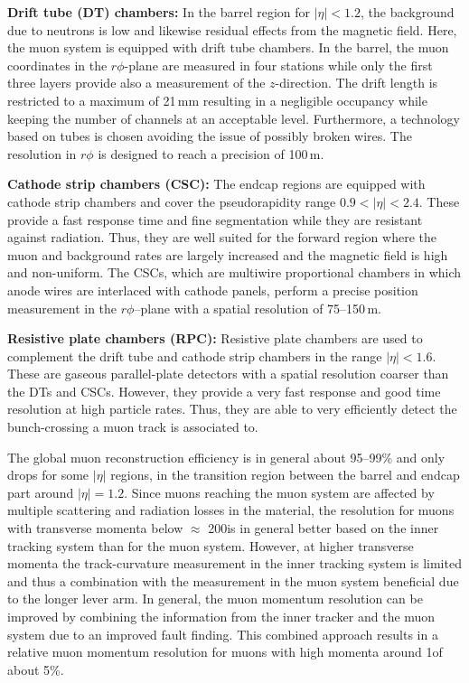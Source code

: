 \begin{description}
 \item \textbf{Drift tube (DT) chambers:} In the barrel region for $|\eta| < 1.2$, the background due to neutrons is low and likewise residual effects from the magnetic field. Here, the muon system is equipped with drift tube chambers. In the barrel, the muon coordinates in the $r\phi$-plane are measured in four stations while only the first three layers provide also a measurement of the $z$-direction. The drift length is restricted to a maximum of 21\,mm resulting in a negligible occupancy while keeping the number of channels at an acceptable level. Furthermore, a technology based on tubes is chosen avoiding the issue of possibly broken wires. The resolution in $r\phi$ is designed to reach a precision of 100\,\textmu m.
 \item \textbf{Cathode strip chambers (CSC):} The endcap regions are equipped with cathode strip chambers and cover the pseudorapidity range $0.9 < |\eta| < 2.4$. These provide a fast response time and fine segmentation while they are resistant against radiation. Thus, they are well suited for the forward region where the muon and background rates are largely increased and the magnetic field is high and non-uniform. The CSCs, which are multiwire proportional chambers in which anode wires are interlaced with cathode panels, perform a precise position measurement in the $r\phi$--plane with a spatial resolution of 75--150\,\textmu m. 
 \item \textbf{Resistive plate chambers (RPC):} Resistive plate chambers are used to complement the drift tube and cathode strip chambers in the range $|\eta| < 1.6$. These are gaseous parallel-plate detectors with a spatial resolution coarser than the DTs and CSCs. However, they provide a very fast response and good time resolution at high particle rates. Thus, they are able to very efficiently detect the bunch-crossing a muon track is associated to. 
\end{description}
The global muon reconstruction efficiency is in general about 95--99\% and only drops for some $|\eta|$ regions, \eg in the transition region between the barrel and endcap part around $|\eta|=1.2$. Since muons reaching the muon system are affected by multiple scattering and radiation losses in the material, the resolution for muons with transverse momenta below $\approx$ 200\gev is in general better based on the inner tracking system than for the muon system. However, at higher transverse momenta the track-curvature measurement in the inner tracking system is limited and thus a combination with the measurement in the muon system beneficial due to the longer lever arm. In general, the muon momentum resolution can be improved by combining the information from the inner tracker and the muon system due to an improved fault finding. This combined approach results in a relative muon momentum resolution for muons with high momenta around 1\tev of about 5\%.

